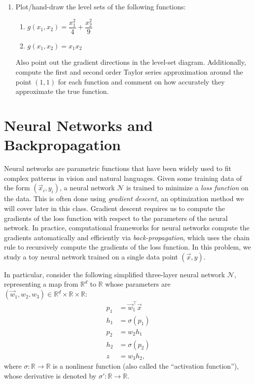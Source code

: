 \documentclass[10pt]{article}
\theoremstyle{definition}
\theoremstyle{plain}
\newcommand{\RR}{\mathbb{R}}
\begin{document}
\begin{enumerate}[label=(\alph*)]
\item Plot/hand-draw the level sets of the following functions:
\begin{enumerate}[label=\roman*.]
    \item $g(x_1, x_2) = \dfrac{x_1^2}{4} + \dfrac{x_2^2}{9}$
    \item $g(x_1, x_2) = x_1 x_2$
\end{enumerate}

Also point out the gradient directions in the level-set diagram. Additionally, compute the first and second order Taylor series approximation around the point $(1,1)$ for each function and comment on how accurately they approximate the true function.
\end{enumerate}

\section{Neural Networks and Backpropagation}

Neural networks are parametric functions that have been widely used to fit complex patterns in vision and natural languages. Given some training data of the form $(\vec{x}_i, y_i)$, a neural network $\mathcal{N}$ is trained to minimize a \emph{loss function} on the data. This is often done using \emph{gradient descent}, an optimization method we will cover later in this class. Gradient descent requires us to compute the gradients of the loss function with respect to the parameters of the neural network. In practice, computational frameworks for neural networks compute the gradients automatically and efficiently via \emph{back-propagation}, which uses the chain rule to recursively compute the gradients of the loss function. In this problem, we study a toy neural network trained on a single data point $(\vec{x}, y)$.

In particular, consider the following simplified three-layer neural network $\mathcal{N}$, representing a map from $\RR^d$ to $\RR$ whose parameters are $(\vec{w}_1, w_2, w_3) \in \RR^d \times \RR \times \RR$:
\begin{align}
p_1 &= \vec{w}_1^\top \vec{x} \\
h_1 &= \sigma(p_1) \\
p_2 &= w_2 h_1 \\
h_2 &= \sigma(p_2) \\
z &= w_3 h_2,
\end{align}
where $\sigma : \RR \to \RR$ is a nonlinear function (also called the ``activation function''), whose derivative is denoted by $\sigma' : \RR \to \RR$.
\end{document}
